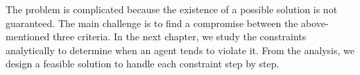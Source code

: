 The problem is complicated because the existence of a possible solution is not guaranteed. The main challenge is to find a compromise between the above-mentioned three criteria. In the next chapter, we study the constraints analytically to determine when an agent tends to violate it. From the analysis, we design a feasible solution to handle each constraint step by step.






